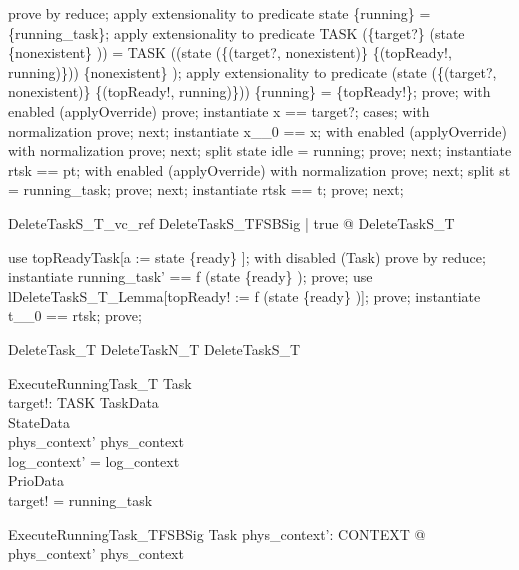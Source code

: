 \begin{zproof}
prove by reduce;
apply extensionality to predicate state \inv  \limg  \{running\} \rimg  = \{running\_task\};
apply extensionality to predicate TASK \setminus  (\{target?\} \cup  (state \inv  \limg  \{nonexistent\} \rimg )) = TASK \setminus  ((state \oplus  (\{(target?, nonexistent)\} \cup  \{(topReady!, running)\})) \inv  \limg  \{nonexistent\} \rimg );
apply extensionality to predicate (state \oplus  (\{(target?, nonexistent)\} \cup  \{(topReady!, running)\})) \inv  \limg  \{running\} \rimg  = \{topReady!\};
prove;
with enabled (applyOverride) prove;
instantiate x == target?;
cases;
with normalization prove;
next;
instantiate x\_\_0 == x;
with enabled (applyOverride) with normalization prove;
next;
split state idle = running;
prove;
next;
instantiate rtsk == pt;
with enabled (applyOverride) with normalization prove;
next;
split st = running\_task;
prove;
next;
instantiate rtsk == t;
prove;
next;
\end{zproof}

\begin{theorem}{DeleteTaskS\_T\_vc\_ref}
\forall  DeleteTaskS\_TFSBSig | true @ \pre  DeleteTaskS\_T
\end{theorem}

\begin{zproof}
use topReadyTask[a := state \inv  \limg  \{ready\} \rimg ];
with disabled (Task) prove by reduce;
instantiate running\_task' == f (state \inv  \limg  \{ready\} \rimg );
prove;
use lDeleteTaskS\_T\_Lemma[topReady! := f (state \inv  \limg  \{ready\} \rimg )];
prove;
instantiate t\_\_0 == rtsk;
prove;
\end{zproof}

\begin{zed}
DeleteTask\_T  DeleteTaskN\_T \lor  DeleteTaskS\_T
\end{zed}

\begin{schema}{ExecuteRunningTask\_T}
  \Delta Task\\
  target!: TASK
\where
  \Xi TaskData\\
  \Xi StateData\\
  phys\_context' \neq  phys\_context\\
  log\_context' = log\_context\\
  \Xi PrioData\\
  target! = running\_task
\end{schema}

\begin{schema}{ExecuteRunningTask\_TFSBSig}
  Task
\where
  \exists  phys\_context': CONTEXT @ phys\_context' \neq  phys\_context
\end{schema}


